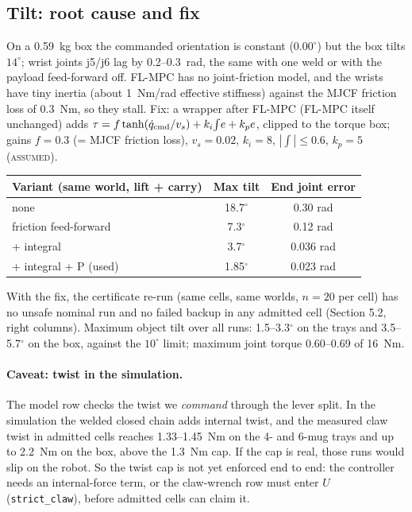 \documentclass[11pt,a4paper]{article}
\newcommand{\lab}[1]{\textsc{#1}}
\begin{document}
\subsection{Tilt: root cause and fix}
On a 0.59~kg box the commanded orientation is constant ($0.00^\circ$) but the box tilts $14^\circ$; wrist joints j5/j6 lag by
0.2--0.3~rad, the same with one weld or with the payload feed-forward off. FL-MPC has no joint-friction model, and the wrists
have tiny inertia (about 1~Nm/rad effective stiffness) against the MJCF friction loss of 0.3~Nm, so they stall. Fix: a wrapper
after FL-MPC (FL-MPC itself unchanged) adds $\tau = f\tanh(\dot q_{\rm cmd}/v_s) + k_i\!\int\! e + k_p e$, clipped to the torque
box; gains $f=0.3$ (= MJCF friction loss), $v_s=0.02$, $k_i=8$, $|{\int}|\le 0.6$, $k_p=5$ (\lab{assumed}).
\begin{center}\small
\begin{tabular}{@{}lcc@{}}
\toprule
Variant (same world, lift + carry) & Max tilt & End joint error\\
\midrule
none & 18.7$^\circ$ & 0.30 rad\\
friction feed-forward & 7.3$^\circ$ & 0.12 rad\\
+ integral & 3.7$^\circ$ & 0.036 rad\\
+ integral + P (used) & 1.85$^\circ$ & 0.023 rad\\
\bottomrule
\end{tabular}
\end{center}
With the fix, the certificate re-run (same cells, same worlds, $n=20$ per cell) has no unsafe nominal run and no failed backup
in any admitted cell (Section 5.2, right columns). Maximum object tilt over all runs: 1.5--3.3$^\circ$ on the trays and
3.5--5.7$^\circ$ on the box, against the $10^\circ$ limit; maximum joint torque 0.60--0.69 of 16~Nm.

\paragraph{Caveat: twist in the simulation.} The model row checks the twist we \emph{command} through the lever split. In the
simulation the welded closed chain adds internal twist, and the measured claw twist in admitted cells reaches 1.33--1.45~Nm on the
4- and 6-mug trays and up to 2.2~Nm on the box, above the 1.3~Nm cap. If the cap is real, those runs would slip on the robot.
So the twist cap is not yet enforced end to end: the controller needs an internal-force term, or the claw-wrench row must enter
$U$ (\texttt{strict\_claw}), before admitted cells can claim it.
\end{document}
